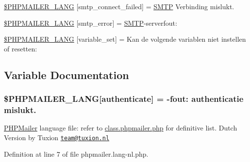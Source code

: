 \begin{DoxyCompactItemize}
\item 
\hyperlink{phpmailer_8lang-nl_8php_a7b321d4ca1e9df702403ed4c61aa0980}{\$\+P\+H\+P\+M\+A\+I\+L\+E\+R\+\_\+\+L\+A\+NG} \mbox{[}\textquotesingle{}smtp\+\_\+connect\+\_\+failed\textquotesingle{}\mbox{]} = \textquotesingle{}\hyperlink{class_s_m_t_p}{S\+M\+TP} Verbinding mislukt.\textquotesingle{}
\item 
\hyperlink{phpmailer_8lang-nl_8php_a7d9cffba1e669c845f8a4c891ee50064}{\$\+P\+H\+P\+M\+A\+I\+L\+E\+R\+\_\+\+L\+A\+NG} \mbox{[}\textquotesingle{}smtp\+\_\+error\textquotesingle{}\mbox{]} = \textquotesingle{}\hyperlink{class_s_m_t_p}{S\+M\+TP}-\/serverfout\+: \textquotesingle{}
\item 
\hyperlink{phpmailer_8lang-nl_8php_af795debc7a739d038742691c358d9032}{\$\+P\+H\+P\+M\+A\+I\+L\+E\+R\+\_\+\+L\+A\+NG} \mbox{[}\textquotesingle{}variable\+\_\+set\textquotesingle{}\mbox{]} = \textquotesingle{}Kan de volgende variablen niet instellen of resetten\+: \textquotesingle{}
\end{DoxyCompactItemize}


\subsection{Variable Documentation}
\subsubsection[{\texorpdfstring{\$\+P\+H\+P\+M\+A\+I\+L\+E\+R\+\_\+\+L\+A\+NG}{$PHPMAILER_LANG}}]{\setlength{\rightskip}{0pt plus 5cm}\$P\+H\+P\+M\+A\+I\+L\+E\+R\+\_\+\+L\+A\+NG\mbox{[}\textquotesingle{}authenticate\textquotesingle{}\mbox{]} = -\/fout\+: authenticatie mislukt.\textquotesingle{}}\hypertarget{phpmailer_8lang-nl_8php_a2cb33073c989b85580748e331ed8b4aa}{}\label{phpmailer_8lang-nl_8php_a2cb33073c989b85580748e331ed8b4aa}
\hyperlink{class_p_h_p_mailer}{P\+H\+P\+Mailer} language file\+: refer to \hyperlink{class_8phpmailer_8php}{class.\+phpmailer.\+php} for definitive list. Dutch Version by Tuxion \href{mailto:team@tuxion.nl}{\tt team@tuxion.\+nl} 

Definition at line 7 of file phpmailer.\+lang-\/nl.\+php.

